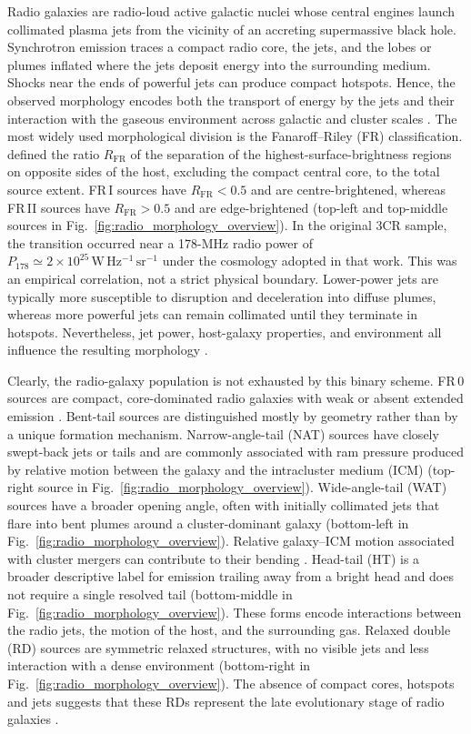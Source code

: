 Radio galaxies are radio-loud active galactic nuclei whose central engines launch collimated plasma jets from the vicinity of an accreting supermassive black hole.
Synchrotron emission traces a compact radio core, the jets, and the lobes or plumes inflated where the jets deposit energy into the surrounding medium. 
Shocks near the ends of powerful jets can produce compact hotspots. Hence, the observed morphology encodes both the transport of energy by the jets and
their interaction with the gaseous environment across galactic and cluster scales \citep{HardcastleCroston2020}.
The most widely used morphological division is the Fanaroff--Riley (FR) classification. 
\citet{Fanaroff1974} defined the ratio $R_{\mathrm{FR}}$ of the separation of the highest-surface-brightness regions on opposite sides of the host, excluding the compact central core, to the total source extent.
FR\,I sources have $R_{\mathrm{FR}}<0.5$ and are centre-brightened, whereas FR\,II sources have $R_{\mathrm{FR}}>0.5$ and are edge-brightened (top-left and top-middle sources in Fig.~\ref{fig:radio_morphology_overview}). 
In the original 3CR sample, the transition occurred near a 178-MHz radio power of $P_{178}\simeq2\times10^{25}\,\mathrm{W\,Hz^{-1}\,sr^{-1}}$ under the cosmology adopted in that work. This was an empirical correlation, not a strict physical boundary. Lower-power jets are typically more susceptible to disruption and deceleration into diffuse plumes, whereas more powerful jets can remain collimated until they terminate in hotspots. Nevertheless, jet power, host-galaxy properties, and environment all influence the resulting morphology \citep{HardcastleCroston2020}.

Clearly, the radio-galaxy population is not exhausted by this binary scheme. FR\,0 sources are compact, core-dominated radio galaxies with weak or absent extended emission \citep{Baldi2015}. 
Bent-tail sources are distinguished mostly by geometry rather than by a unique formation mechanism.
Narrow-angle-tail (NAT) sources have closely swept-back jets or tails and are commonly associated with ram pressure produced by relative motion between the galaxy and the intracluster medium (ICM) (top-right source in Fig.~\ref{fig:radio_morphology_overview}).
Wide-angle-tail (WAT) sources have a broader opening angle, often with initially collimated jets that flare into bent plumes around a cluster-dominant galaxy (bottom-left in Fig.~\ref{fig:radio_morphology_overview}). Relative galaxy--ICM motion associated with cluster mergers can contribute to their bending \citep{Sakelliou2000}.
Head-tail (HT) is a broader descriptive label for emission trailing away from a bright head and does not require a single resolved tail (bottom-middle in Fig.~\ref{fig:radio_morphology_overview}). These forms encode interactions between the radio jets, the motion of the host, and the surrounding gas.
Relaxed double (RD) sources are symmetric relaxed structures, with no visible jets and less interaction with a dense environment (bottom-right in Fig.~\ref{fig:radio_morphology_overview}). The absence of compact cores, hotspots and jets suggests that these RDs represent the late evolutionary stage of radio galaxies \citep{Chilufya2025}.

